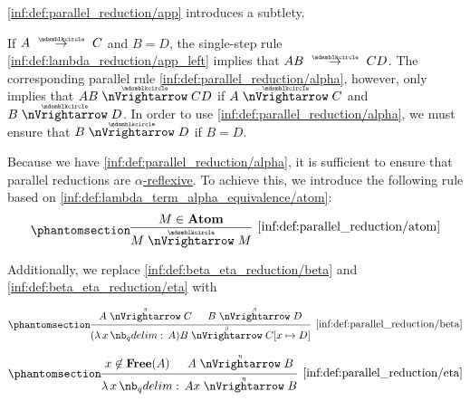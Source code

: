 \begin{definition}
\begin{thmenum}
     \ref{inf:def:parallel_reduction/app} introduces a subtlety.

    If \( A \pred C \) and \( B = D \), the single-step rule \ref{inf:def:lambda_reduction/app_left} implies that \( AB \pred CD \). The corresponding parallel rule \ref{inf:def:parallel_reduction/alpha}, however, only implies that \( AB \ppred CD \) if \( A \ppred C \) and \( B \ppred D \). In order to use \ref{inf:def:parallel_reduction/alpha}, we must ensure that \( B \ppred D \) if \( B = D \).

    Because we have \ref{inf:def:parallel_reduction/alpha}, it is sufficient to ensure that parallel reductions are \hyperref[def:alpha_reflexive]{\( \alpha \)-reflexive}. To achieve this, we introduce the following rule based on \ref{inf:def:lambda_term_alpha_equivalence/atom}:
    \begin{equation*}\taglabel[\ensuremath{ \logic{ParAtom}_{\Anon} }]{inf:def:parallel_reduction/atom}
      \begin{prooftree}
        \hypo{ M \in \op*{Atom} }
        \infer1[\ref{inf:def:parallel_reduction/atom}]{ M \ppred M }
      \end{prooftree}
    \end{equation*}
  \end{thmenum}

   Additionally, we replace \ref{inf:def:beta_eta_reduction/beta} and \ref{inf:def:beta_eta_reduction/eta} with
  \begin{paracol}{2}
    \begin{leftcolumn}
      \begin{equation*}\taglabel[\ensuremath{ \logic{ParRed}_\beta }]{inf:def:parallel_reduction/beta}
        \begin{prooftree}
          \hypo{ A \pbred C }
          \hypo{ B \pbred D }
          \infer2[\ref{inf:def:parallel_reduction/beta}]{ (\qabs x A) B \pbred C[x \mapsto D] }.
        \end{prooftree}
      \end{equation*}
    \end{leftcolumn}

    \begin{rightcolumn}
      \begin{equation*}\taglabel[\ensuremath{ \logic{ParRed}_\eta }]{inf:def:parallel_reduction/eta}
        \begin{prooftree}
          \hypo{ x \not\in \op*{Free}(A) }
          \hypo{ A \pered B }
          \infer2[\ref{inf:def:parallel_reduction/eta}]{ \qabs x A x \pered B }.
        \end{prooftree}
      \end{equation*}
    \end{rightcolumn}
  \end{paracol}


\end{definition}
